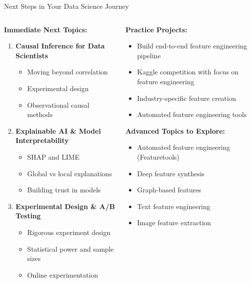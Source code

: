 \documentclass[aspectratio=169,11pt]{beamer}
\begin{document}
\begin{frame}{Next Steps in Your Data Science Journey}
\begin{columns}
\begin{column}{0.5\textwidth}
\textbf{Immediate Next Topics:}
\begin{enumerate}
\item \textbf{Causal Inference for Data Scientists}
   \begin{itemize}
   \item Moving beyond correlation
   \item Experimental design
   \item Observational causal methods
   \end{itemize}

\item \textbf{Explainable AI \& Model Interpretability}
   \begin{itemize}
   \item SHAP and LIME
   \item Global vs local explanations
   \item Building trust in models
   \end{itemize}

\item \textbf{Experimental Design \& A/B Testing}
   \begin{itemize}
   \item Rigorous experiment design
   \item Statistical power and sample sizes
   \item Online experimentation
   \end{itemize}
\end{enumerate}
\end{column}
\begin{column}{0.5\textwidth}
\textbf{Practice Projects:}
\begin{itemize}
\item Build end-to-end feature engineering pipeline
\item Kaggle competition with focus on feature engineering
\item Industry-specific feature creation
\item Automated feature engineering tools
\end{itemize}

\vspace{0.3cm}
\textbf{Advanced Topics to Explore:}
\begin{itemize}
\item Automated feature engineering (Featuretools)
\item Deep feature synthesis
\item Graph-based features
\item Text feature engineering
\item Image feature extraction
\end{itemize}


\end{column}
\end{columns}
\end{frame}
\end{document}
